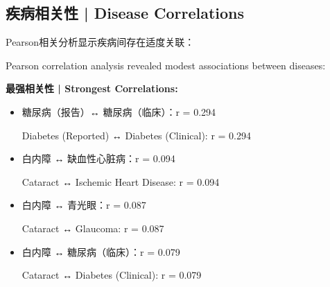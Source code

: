 \documentclass[12pt,a4paper]{article}
\begin{document}
\subsection{疾病相关性 | Disease Correlations}

Pearson相关分析显示疾病间存在适度关联：

Pearson correlation analysis revealed modest associations between diseases:

\textbf{最强相关性 | Strongest Correlations:}
\begin{itemize}
    \item 糖尿病（报告）↔ 糖尿病（临床）：r = 0.294
    
    Diabetes (Reported) ↔ Diabetes (Clinical): r = 0.294
    
    \item 白内障 ↔ 缺血性心脏病：r = 0.094
    
    Cataract ↔ Ischemic Heart Disease: r = 0.094
    
    \item 白内障 ↔ 青光眼：r = 0.087
    
    Cataract ↔ Glaucoma: r = 0.087
    
    \item 白内障 ↔ 糖尿病（临床）：r = 0.079
    
    Cataract ↔ Diabetes (Clinical): r = 0.079
\end{itemize}




\end{document}
